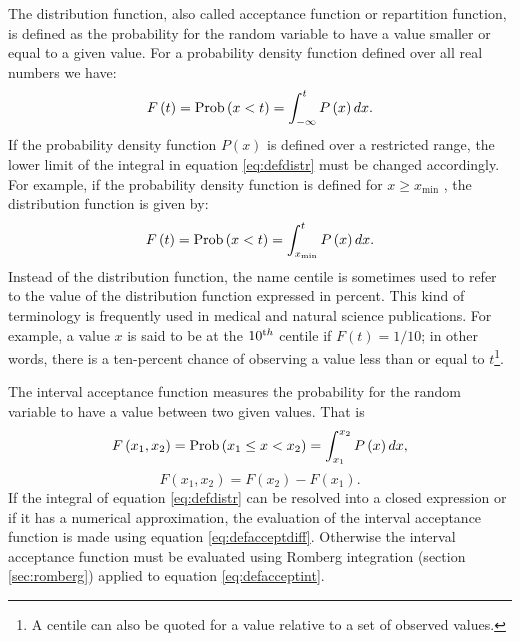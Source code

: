The distribution function, also called acceptance function or
repartition function, is defined as the probability for the random
variable to have a value smaller or equal to a given value. For a
probability density function defined over all real numbers we
have:
\begin{equation}
\label{eq:defdistr}
  F\left(t\right)=\mathop{\textrm{Prob}}\left(x<t\right)=\int_{-\infty}^t P\left(x\right)
  dx.
\end{equation}
If the probability density function $P\left(x\right)$ is defined
over a restricted range, the lower limit of the integral in
equation \ref{eq:defdistr} must be changed accordingly. For
example, if the probability density function is defined for $x\geq
x_{\min}$ , the distribution function is given by:
\begin{equation}
\label{eq:defdistrmin}
  F\left(t\right)=\mathop{\textrm{Prob}}\left(x<t\right)=\int_{x_{\min}}^t P\left(x\right)
  dx.
\end{equation}
Instead of the distribution function,  the name centile is
sometimes used to refer to the value of the distribution function
expressed in percent. This kind of terminology is frequently used
in medical and natural science publications. For example, a value
$x$ is said to be at the $10^{\mathop{\textrm th}}$ centile if
$F\left(t\right)=1/10$; in other words, there is a ten-percent
chance of observing a value less than or equal to $t$\footnote{A
centile can also be quoted for a value relative to a set of
observed values.}.

The interval acceptance function measures the probability for the
random variable to have a value between two given values. That is
\begin{equation}
\label{eq:defacceptint}
  F\left(x_1,x_2\right)=\mathop{\textrm{Prob}}\left(x_1\le x<x_2\right)
  =\int_{x_1}^{x_2} P\left(x\right)dx,
\end{equation}
\begin{equation}
\label{eq:defacceptdiff}
  F\left(x_1,x_2\right)=F\left(x_2\right)-F\left(x_1\right).
\end{equation}
If the integral of equation \ref{eq:defdistr} can be resolved into
a closed expression or if it has a numerical approximation, the
evaluation of the interval acceptance function is made using
equation \ref{eq:defacceptdiff}. Otherwise the interval acceptance
function must be evaluated using Romberg integration (\cf section
\ref{sec:romberg}) applied to equation \ref{eq:defacceptint}.

